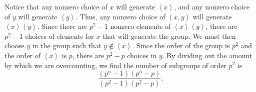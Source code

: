 \documentclass[11pt, letterpaper]{report}
\begin{document}
\begin{solution}
	Notice that any nonzero choice of $x$ will generate $\left<x \right>$, and any nonzero choice of $y$ will generate $\left<y \right>$. Thus, any nonzero choice of $(x,y)$ will generate $\left<x \right>\left<y \right>$. Since there are $p^2-1$ nonzero elements of $\left<x \right>\left<y \right>$, there are $p^2-1$ choices of elements for $x$ that will generate the group. We must then choose $y$ in the group such that $y\notin \left<x \right>$. Since the order of the group is $p^2$ and the order of $\left<x \right>$ is $p$, there are $p^2-p$ choices in $y$. By dividing out the amount by which we are overcounting, we find the number of subgroups of order $p^2$ is
	\[
		\frac{\left( p^n-1 \right) \left( p^n-p \right) }{\left( p^2-1 \right) \left( p^2-p \right) }
	.\]
\end{solution}
\end{document}
